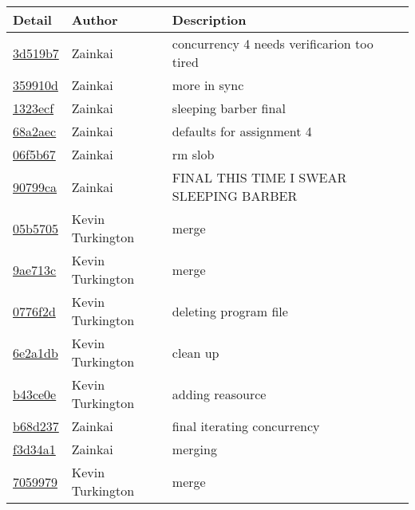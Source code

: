 \begin{tabular}{l l l}\textbf{Detail} & \textbf{Author} & \textbf{Description}\\\hline
\href{https://github.com/zainkai/CS444/commit/3d519b7548c1b98a8a863850ae6e0153ab224225}{3d519b7} & Zainkai & concurrency 4 needs verificarion too tired\\\hline
\href{https://github.com/zainkai/CS444/commit/359910dddcf2fc23681d384d230264c7abf1eac2}{359910d} & Zainkai & more in sync\\\hline
\href{https://github.com/zainkai/CS444/commit/1323ecf1dc0b46e2635b638972b261c53e83e64f}{1323ecf} & Zainkai & sleeping barber final\\\hline
\href{https://github.com/zainkai/CS444/commit/68a2aec0b04688107dfcda4da28b9bbdb1ae8511}{68a2aec} & Zainkai & defaults for assignment 4\\\hline
\href{https://github.com/zainkai/CS444/commit/06f5b6787b8c183fa292032a320d1beb8e0a108c}{06f5b67} & Zainkai & rm slob\\\hline
\href{https://github.com/zainkai/CS444/commit/90799ca9b5a5fff6c781ef46c55c3d1c297a2ebf}{90799ca} & Zainkai & FINAL THIS TIME I SWEAR SLEEPING BARBER\\\hline
\href{https://github.com/zainkai/CS444/commit/05b57056c858d1c359f1725895d908939d7a5c75}{05b5705} & Kevin Turkington & merge\\\hline
\href{https://github.com/zainkai/CS444/commit/9ae713cdc5db0f6f9a41329259036811bafd841d}{9ae713c} & Kevin Turkington & merge\\\hline
\href{https://github.com/zainkai/CS444/commit/0776f2dd612cd32879617c567eb4d065295a281b}{0776f2d} & Kevin Turkington & deleting program file\\\hline
\href{https://github.com/zainkai/CS444/commit/6e2a1db8ef830076841f23744e468a6b54947335}{6e2a1db} & Kevin Turkington & clean up\\\hline
\href{https://github.com/zainkai/CS444/commit/b43ce0ee0eb5df33ff82de8e2f9ed22beac7d548}{b43ce0e} & Kevin Turkington & adding reasource\\\hline
\href{https://github.com/zainkai/CS444/commit/b68d2374846d9560017866c5eaeb9eaf95d4b041}{b68d237} & Zainkai & final iterating concurrency\\\hline
\href{https://github.com/zainkai/CS444/commit/f3d34a152be1e494673e359f41161551725558a4}{f3d34a1} & Zainkai & merging\\\hline
\href{https://github.com/zainkai/CS444/commit/7059979332b746cf786760659a10bd88a97d6b1d}{7059979} & Kevin Turkington & merge\\\hline

\end{tabular}
